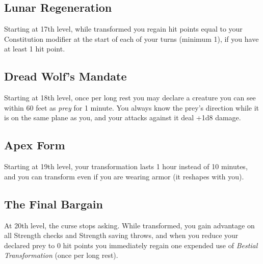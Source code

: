 \subsection*{Lunar Regeneration}
Starting at 17th level, while transformed you regain hit points equal to your Constitution modifier at the start of each of your turns (minimum 1), if you have at least 1 hit point.

\subsection*{Dread Wolf's Mandate}
Starting at 18th level, once per long rest you may declare a creature you can see within 60 feet as \emph{prey} for 1 minute. You always know the prey's direction while it is on the same plane as you, and your attacks against it deal +1d8 damage.

\subsection*{Apex Form}
Starting at 19th level, your transformation lasts 1 hour instead of 10 minutes, and you can transform even if you are wearing armor (it reshapes with you).

\subsection*{The Final Bargain}
At 20th level, the curse stops asking. While transformed, you gain advantage on all Strength checks and Strength saving throws, and when you reduce your declared prey to 0 hit points you immediately regain one expended use of \emph{Bestial Transformation} (once per long rest).

\newpage
